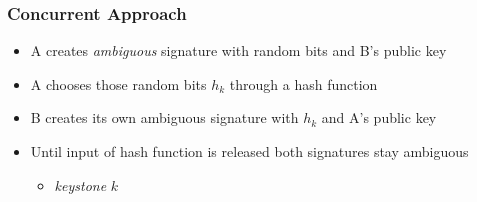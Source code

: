 \begin{frame}
	\frametitle{Concurrent Approach}
	
	\begin{itemize}
		\setlength\itemsep{1em}
		\item<1-> A creates \textit{ambiguous} signature with random bits and B's public key
		\item<2-> A chooses those random bits $h_k$ through a hash function
		\item<3-> B creates its own ambiguous signature with $h_k$ and A's public key
		\item<4-> Until input of hash function is released both signatures stay ambiguous  
			\begin{itemize}
				\item \textit{keystone} $k$
			\end{itemize}
	\end{itemize}
\end{frame}